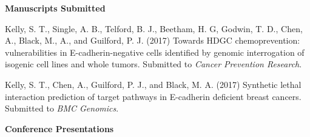 \textbf{Manuscripts Submitted}

\begin{small}
Kelly, S. T., Single, A. B., Telford, B. J., Beetham, H. G, Godwin, T. D., Chen, A., Black, M., A., and Guilford, P. J. (2017) Towards HDGC chemoprevention: vulnerabilities in E-cadherin-negative cells identified by genomic interrogation of isogenic cell lines and whole tumors.  Submitted to \textit{Cancer Prevention Research}.

Kelly, S. T., Chen, A., Guilford, P. J., and Black, M. A. (2017) Synthetic lethal interaction prediction of target pathways in E-cadherin deficient breast cancers. Submitted to \textit{BMC Genomics}.
\end{small}
\iffalse
\textbf{Community Blog Posts}

Black, M. A., Kelly, S. T., and Cadzow, M.
Posted on the \textit{Software Carpentry} website 2016 July 4\textsuperscript{th}: 
``Software Carpentry workshop at the University of Otago, New Zealand''
\url{https://software-carpentry.org/blog/2016/07/otago-workshop.html}

Kelly, S. T., Black, M., A., Bae, S., Hayek, W., and Pawlik, A. Posted on the \textit{Software Carpentry} website 2016 September 28\textsuperscript{th}:  ``Software Carpentry Workshop Attendance: a New Zealand Perspective``
\url{https://software-carpentry.org/blog/2016/09/attendance-nz.html}
\fi

\textbf{Conference Presentations}

